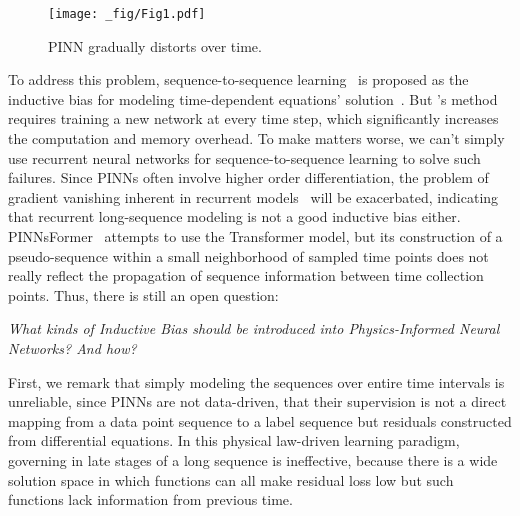 \begin{figure}[t!]
    \centering
    \texttt{[image: \_fig/Fig1.pdf]}
    \caption{PINN gradually distorts over time.}
    \label{fig1}
    \vspace{-3mm}
\end{figure}

To address this problem, sequence-to-sequence learning~\cite{sutskever2014sequence} is proposed as the inductive bias for modeling time-dependent equations' solution~\cite{krishnapriyan2021characterizing}.
    But \citet{sutskever2014sequence}'s method requires training a new network at every time step, which significantly increases the computation and memory overhead.
To make matters worse, we can't simply use recurrent neural networks for sequence-to-sequence learning to solve such failures. Since PINNs often involve higher order differentiation, the problem of gradient vanishing inherent in recurrent models~\cite{hochreiter1998vanishing} will be exacerbated, indicating that recurrent long-sequence modeling is not a good inductive bias either. PINNsFormer~\cite{zhao2024pinnsformer} attempts to use the Transformer model, but its construction of a pseudo-sequence within a small neighborhood of sampled time points does not really reflect the propagation of sequence information between time collection points. Thus, there is still an open question:
\vspace{-2mm}
\begin{center}
\textit{What kinds of Inductive Bias should be introduced into Physics-Informed Neural Networks? And how?}
\end{center}
\vspace{-2mm}

 First, we remark that simply modeling the sequences over entire time intervals is unreliable, since PINNs are not data-driven, that their supervision is not a direct mapping from a data point sequence to a label sequence but residuals constructed from differential equations. In this physical law-driven learning paradigm, governing in late stages of a long sequence is ineffective, because there is a wide solution space in which functions can all make residual loss low but such functions lack information from previous time. 
 
